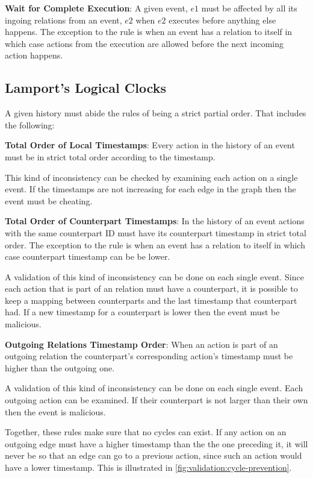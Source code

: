 	\newpar \textbf{Wait for Complete Execution}: A given event, $e1$ must be affected by all its ingoing relations from an event, $e2$ when $e2$ executes before anything else happens. The exception to the rule is when an event has a relation to itself in which case actions from the execution are allowed before the next incoming action happens. 
	
	\subsection{Lamport's Logical Clocks}
	A given history must abide the rules of being a strict partial order. That includes the following:
	
	\newpar \textbf{Total Order of Local Timestamps}: Every action in the history of an event must be in strict total order according to the timestamp.
	
	This kind of inconsistency can be checked by examining each action on a single event. If the timestamps are not increasing for each edge in the graph then the event must be cheating. 
	
	\newpar \textbf{Total Order of Counterpart Timestamps}: In the history of an event actions with the same counterpart ID must have its counterpart timestamp in strict total order.  The exception to the rule is when an event has a relation to itself in which case counterpart timestamp can be be lower.
	
	A validation of this kind of inconsistency can be done on each single event. Since each action that is part of an relation must have a counterpart, it is possible to keep a mapping between counterparts and the last timestamp that counterpart had. If a new timestamp for a counterpart is lower then the event must be malicious.
	
	\newpar \textbf{Outgoing Relations Timestamp Order}: When an action is part of an outgoing relation the counterpart's corresponding action's timestamp must be higher than the outgoing one.
	
	A validation of this kind of inconsistency can be done on each single event. Each outgoing action can be examined. If their counterpart is not larger than their own then the event is malicious.
	
	\newpar Together, these rules make sure that no cycles can exist. If any action on an outgoing edge must have a higher timestamp than the the one preceding it, it will never be so that an edge can go to a previous action, since such an action would have a lower timestamp. This is illustrated in \autoref{fig:validation:cycle-prevention}.
	
